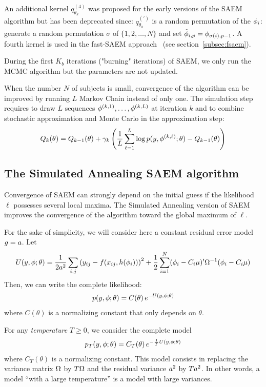 An additional kernel $q_{\theta_k}^{(4)}$ was proposed for the early versions of 
the SAEM algorithm but has been deprecated since: $q_{\theta_k}^{(')}$ is a 
random permutation of the ${\phi}_i$: generate a random permutation $\sigma$ of 
$\{1,2,\ldots,N\}$ and set $\tilde{{\phi}}_{i,p}={\phi}_{\sigma(i),p-1}$. A 
fourth kernel is used in the fast-SAEM approach~\cite{Karimi19} (see 
section~\ref{subsec:fsaem}).

 During the first $K_b$ iterations ("burning" iterations) of SAEM, we only run the MCMC algorithm but the parameters are not updated.

  When the number $N$ of subjects is small, convergence of the algorithm can be improved by running $L$ Markov Chain instead of only one. The simulation step requires to draw $L$ sequences $ { {\phi}^{(k,1)}} ,\ldots , { {\phi}^{(k,L)}} $ at iteration $k$ and to combine stochastic approximation and Monte Carlo in the approximation step:
\begin{equation} \label{approx2}
 Q_k(\theta) = Q_{k-1}(\theta) + \gamma_k \left( \frac{1}{L}\sum_{\ell=1}^{L} \log p(y, { {\phi}^{(k,\ell)}} ;\theta) - Q_{k-1}(\theta) \right)
\end{equation}


\subsection{The Simulated Annealing SAEM algorithm}
Convergence of SAEM can strongly depend on the initial guess if the likelihood $\ell$ possesses several local maxima. The Simulated Annealing version of SAEM improves the convergence of the algorithm toward the global maximum of $\ell$.

For the sake of simplicity, we will consider here a constant residual error model $g=a$. Let 
$$ U(\yg,\phig;\theta) = \frac{1}{2\ag^2} \sum_{i,j}\left(y_{ij} - f(x_{ij},h(\phigi)) \right)^2 +\frac{1}{2}\sum_{i=1}^{N}(\phigi-\magi\fixed_effect)^\prime \IIV^{-1}(\phigi-\magi\fixed_effect)$$ 
Then, we can write the complete likelihood:
\begin{eqnarray*}
p(y,{\phi};\theta)  =  C(\theta)\, e^{-U(y,{\phi};\theta)}
\end{eqnarray*}
where $C(\theta)$ is a normalizing constant that only depends on $\theta$.

For any {\it temperature} $T\geq0$, we consider the complete model
\begin{eqnarray*}
p_T(y,{\phi};\theta)  =  C_T(\theta)\, e^{-\frac{1}{T}U(y,{\phi};\theta)}
\end{eqnarray*}
where $C_T(\theta)$ is a normalizing constant. This model consists in replacing the variance matrix ${\Omega}$ by $T{\Omega}$ and the residual variance $a^2$ by $Ta^2$. In other words, a model ``with a large temperature'' is a model with large variances.

